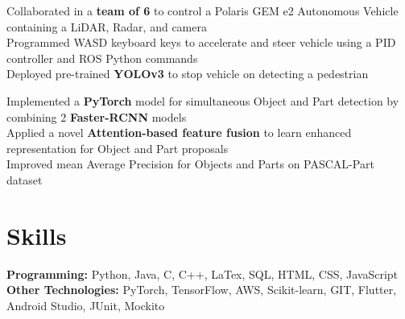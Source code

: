 \documentclass[]{Resume}
\begin{document}

\pt Collaborated in a \textbf{team of 6} to control a Polaris GEM e2 Autonomous Vehicle containing a LiDAR, Radar, and camera \\
\pt Programmed WASD keyboard keys to accelerate and steer vehicle using a PID controller and ROS Python commands \\
\pt Deployed pre-trained \textbf{YOLOv3} to stop vehicle on detecting a pedestrian
\sectionsep

\pt Implemented a \textbf{PyTorch} model for simultaneous Object and Part detection by combining 2 \textbf{Faster-RCNN} models \\
\pt Applied a novel \textbf{Attention-based feature fusion} to learn enhanced representation for Object and Part proposals \\
\pt Improved mean Average Precision for Objects and Parts on PASCAL-Part dataset
\sectionsep

\section{Skills} 
\hrulefill

\pt \textbf{Programming:} Python, Java, C, C++, LaTex, SQL, HTML, CSS, JavaScript \\
\pt \textbf{Other Technologies:} PyTorch, TensorFlow, AWS, Scikit-learn, GIT, Flutter, Android Studio, JUnit, Mockito

\sectionsep

\end{document}
